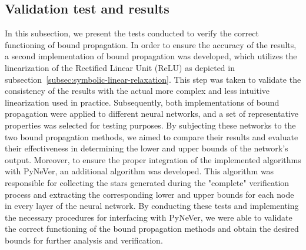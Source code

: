 \subsection{Validation test and results}
In this subsection, we present the tests conducted to verify the correct functioning of bound propagation.
In order to ensure the accuracy of the results, a second implementation of bound propagation was developed, which utilizes the linearization of the Rectified Linear Unit (ReLU) as depicted in subsection~\ref{subsec:symbolic-linear-relaxation}. 
This step was taken to validate the consistency of the results with the actual more complex and less intuitive linearization used in practice.
Subsequently, both implementations of bound propagation were applied to different neural networks, and a set of representative properties was selected for testing purposes. 
By subjecting these networks to the two bound propagation methods, we aimed to compare their results and evaluate their effectiveness in determining the lower and upper bounds of the network's output.
Moreover, to ensure the proper integration of the implemented algorithms with PyNeVer, an additional algorithm was developed. 
This algorithm was responsible for collecting the stars generated during the "complete" verification process and extracting the corresponding lower and upper bounds for each node in every layer of the neural network.
By conducting these tests and implementing the necessary procedures for interfacing with PyNeVer, we were able to validate the correct functioning of the bound propagation methods and obtain the desired bounds for further analysis and verification.\\

